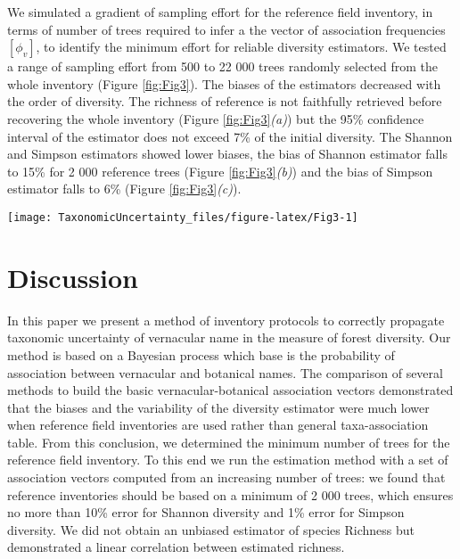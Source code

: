 \documentclass[fleqn,10pt]{ArtEcoFoG} %
\begin{document}
We simulated a gradient of sampling effort for the reference field
inventory, in terms of number of trees required to infer a the vector of
association frequencies \([\phi_v]\), to identify the minimum effort for
reliable diversity estimators. We tested a range of sampling effort from
500 to 22 000 trees randomly selected from the whole inventory (Figure
\ref{fig:Fig3}). The biases of the estimators decreased with the order
of diversity. The richness of reference is not faithfully retrieved
before recovering the whole inventory (Figure \ref{fig:Fig3}\emph{(a)})
but the 95\% confidence interval of the estimator does not exceed 7\% of
the initial diversity. The Shannon and Simpson estimators showed lower
biases, the bias of Shannon estimator falls to 15\% for 2 000 reference
trees (Figure \ref{fig:Fig3}\emph{(b)}) and the bias of Simpson
estimator falls to 6\% (Figure \ref{fig:Fig3}\emph{(c)}).

\begin{figure*}
\texttt{[image: TaxonomicUncertainty\_files/figure-latex/Fig3-1]} \caption{Degradation along a sampling effort gradient of the Richness, Shannon and Simpson diversities estimated for the reference inventory in vernacular names. The propagation method to estimate the diversities is only based on the reference field inventory. Above plots correspond to the estimated diversity in equivalent number of species and below plots correspond to the relative bias of the estimation compared to the value of the reference field inventory. For both dashed lines represent the value of the reference field inventory and crosses and red lines respectively represent the mean, 0.05 and 0.95 quantiles estimated after 1000 iterations.}\label{fig:Fig3}
\end{figure*}

\section{Discussion}\label{discussion}

In this paper we present a method of inventory protocols to correctly
propagate taxonomic uncertainty of vernacular name in the measure of
forest diversity. Our method is based on a Bayesian process which base
is the probability of association between vernacular and botanical
names. The comparison of several methods to build the basic
vernacular-botanical association vectors demonstrated that the biases
and the variability of the diversity estimator were much lower when
reference field inventories are used rather than general
taxa-association table. From this conclusion, we determined the minimum
number of trees for the reference field inventory. To this end we run
the estimation method with a set of association vectors computed from an
increasing number of trees: we found that reference inventories should
be based on a minimum of 2 000 trees, which ensures no more than 10\%
error for Shannon diversity and 1\% error for Simpson diversity. We did
not obtain an unbiased estimator of species Richness but demonstrated a
linear correlation between estimated richness.
\end{document}
